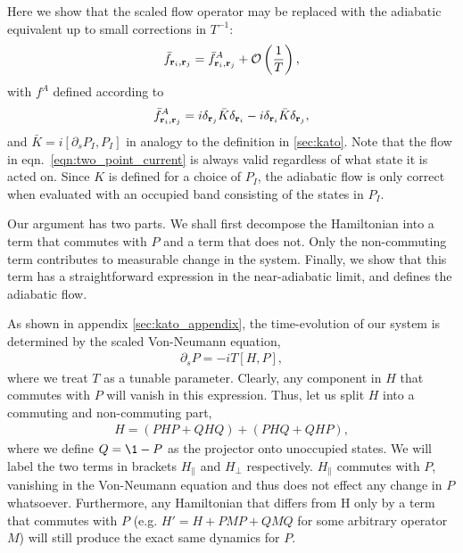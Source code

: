 Here we show that the scaled flow operator may be replaced with the adiabatic equivalent up to small corrections in $T^{-1}$:
\begin{align}
    \bar f_{\textbf r_i, \textbf r_j} = \bar f_{\textbf r_i,\textbf r_j}^A + \mathcal{O} \left ( \frac{1}{T} \right),
\end{align}
with $f^A$ defined according to
\begin{align}\label{eqn:adiabatic_current}
        \bar f_{\textbf r_i,\textbf r_j}^A = i \delta_{\textbf r_j} \bar K\delta_{\textbf r_i }-i\delta_{\textbf r_i}\bar K\delta_{ \textbf r_j },
\end{align}
and $\bar K = i[\partial_s P_I , P_I] $ in analogy to the definition in \textsection \ref{sec:kato}. Note that the flow in eqn.~\ref{eqn:two_point_current} is always valid regardless of what state it is acted on. Since $K$ is defined for a choice of $P_I$, the adiabatic flow is only correct when evaluated with an occupied band consisting of the states in $P_I$.\par
Our argument has two parts. We shall first decompose the Hamiltonian into a term that commutes with $P$ and a term that does not. Only the non-commuting term contributes to measurable change in the system. Finally, we show that this term has a straightforward expression in the near-adiabatic limit, and defines the adiabatic flow. \par
As shown in appendix \ref{sec:kato_appendix}, the time-evolution of our system is determined by the scaled Von-Neumann equation,
\begin{align}\label{eqn:von_neumann_ap}
    \partial_{s} P = -i T[H,P],
\end{align}
where we treat $T$ as a tunable parameter. Clearly, any component in $H$ that commutes with $P$ will vanish in this expression. Thus, let us split $H$ into a commuting and non-commuting part,
\begin{align}
    H = (PHP + QHQ) + (PHQ + QHP),
\end{align}
where we define $Q = \1 - P$ as the projector onto unoccupied states. We will label the two terms in brackets $H_{\parallel}$ and $H_{\perp}$ respectively. $H_{\parallel}$ commutes with $P$, vanishing in the Von-Neumann equation and thus does not effect any change in $P$ whatsoever. Furthermore, any Hamiltonian that differs from H only by a term that commutes with $P$ (e.g. $H' = H + PMP + QMQ$ for some arbitrary operator $M$) will still produce the exact same dynamics for $P$.\par
